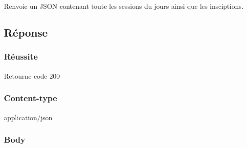 \paragraph{}
	Renvoie un JSON contenant toute les sessions du jours ainsi que les insciptions.
	
\subsection{Réponse}
	\subsubsection{Réussite}
		\paragraph{}
			Retourne code 200
			
	\subsubsection{Content-type}
		\paragraph{}
			application/json
	
	\subsubsection{Body}
	